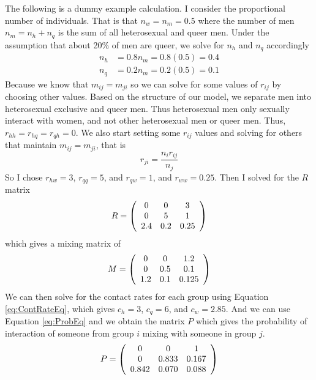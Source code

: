 \documentclass[12pt]{article}
\begin{document}
The following is a dummy example calculation.  I consider the proportional number of individuals.  That is that $n_w=n_m=0.5$ where the number of men $n_m=n_h+n_q$ is the sum of all heterosexual and queer men.  Under the assumption that about 20\% of men are queer, we solve for $n_h$ and $n_q$ accordingly
\begin{align}
n_h&=0.8n_m = 0.8(0.5) = 0.4\\
n_q&=0.2n_m = 0.2(0.5) = 0.1
\end{align}
Because we know that $m_{ij}=m_{ji}$ so we can solve for some values of $r_{ij}$ by choosing other values.  Based on the structure of our model, we separate men into heterosexual exclusive and queer men.  Thus heterosexual men only sexually interact with women, and not other heterosexual men or queer men. Thus, $r_{hh}=r_{hq}=r_{qh}=0$.  We also start setting some $r_{ij}$ values and solving for others that maintain $m_{ij}=m_{ji}$, that is
\begin{equation}
r_{ji}=\frac{n_ir_{ij}}{n_j}
\end{equation}
So I chose $r_{hw}=3$, $r_{qq}=5$, and $r_{qw}=1$, and $r_{ww}=0.25$.  Then I solved for the $R$ matrix
\begin{equation}
R=\left(\begin{array}{c c c}
0 & 0 & 3 \\
0 & 5 & 1 \\
2.4 & 0.2 & 0.25
\end{array}\right)
\end{equation}
which gives a mixing matrix of 
\begin{equation}
M=\left(\begin{array}{c c c}
0 & 0 & 1.2 \\
0 & 0.5 & 0.1 \\
1.2 & 0.1 & 0.125
\end{array}\right)
\end{equation}
We can then solve for the contact rates for each group using Equation \eqref{eq:ContRateEq}, which gives $c_h=3$, $c_q=6$, and $c_w=2.85$. And we can use Equation \eqref{eq:ProbEq} and we obtain the matrix $P$ which gives the probability of interaction of someone from group $i$ mixing with someone in group $j$. 
\begin{equation}
P=\left(\begin{array}{c c c}
0 & 0 & 1 \\
0 & 0.833 & 0.167 \\
0.842 & 0.070 & 0.088
\end{array}\right)
\end{equation}
\end{document}
